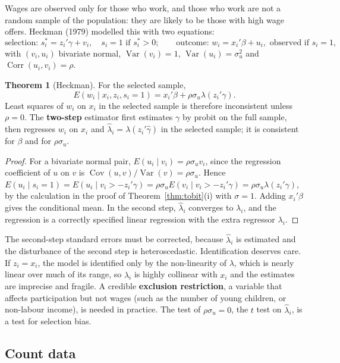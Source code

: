 \documentclass[11pt,a4paper]{article}
\numberwithin{equation}{section}
\DeclareMathOperator{\Var}{Var}
\DeclareMathOperator{\Cov}{Cov}
\DeclareMathOperator{\Corr}{Corr}
\theoremstyle{definition}
\newtheorem{thm}{Theorem}[subsection]
\begin{document}
Wages are observed only for those who work, and those who work are not a random sample of the population: they are likely to be those with
high wage offers. Heckman (1979) modelled this with two equations:
\[
\text{selection: } s_i^* = z_i'\gamma + v_i, \quad s_i = 1 \text{ if } s_i^* > 0; \qquad \text{outcome: } w_i = x_i'\beta + u_i, \text{ observed if } s_i = 1,
\]
with $(v_i, u_i)$ bivariate normal, $\Var(v_i) = 1$, $\Var(u_i) = \sigma_u^2$ and $\Corr(u_i, v_i) = \rho$.

\begin{thm}[Heckman]
\label{thm:heckman}
For the selected sample,
\[
E(w_i \mid x_i, z_i, s_i = 1) = x_i'\beta + \rho\sigma_u\lambda(z_i'\gamma) .
\]
Least squares of $w_i$ on $x_i$ in the selected sample is therefore inconsistent unless $\rho = 0$. The \textbf{two-step} estimator first estimates $\gamma$ by probit on the full
sample, then regresses $w_i$ on $x_i$ and $\hat\lambda_i = \lambda(z_i'\hat\gamma)$ in the selected sample; it is consistent for $\beta$ and for $\rho\sigma_u$.
\end{thm}

\begin{proof}
For a bivariate normal pair, $E(u_i \mid v_i) = \rho\sigma_uv_i$, since the regression coefficient of $u$ on $v$ is $\Cov(u, v)/\Var(v) = \rho\sigma_u$. Hence
$E(u_i \mid s_i = 1) = E(u_i \mid v_i > -z_i'\gamma) = \rho\sigma_uE(v_i \mid v_i > -z_i'\gamma) = \rho\sigma_u\lambda(z_i'\gamma)$, by the calculation in the proof of Theorem~\ref{thm:tobit}(i) with $\sigma = 1$. Adding
$x_i'\beta$ gives the conditional mean. In the second step, $\hat\lambda_i$ converges to $\lambda_i$, and the regression is a correctly specified linear regression with the extra
regressor $\lambda_i$.
\end{proof}

The second-step standard errors must be corrected, because $\hat\lambda_i$ is estimated and the disturbance of the second step is heteroscedastic.
Identification deserves care. If $z_i = x_i$, the model is identified only by the non-linearity of $\lambda$, which is nearly linear over much of its range, so $\hat\lambda_i$
is highly collinear with $x_i$ and the estimates are imprecise and fragile. A credible \textbf{exclusion restriction}, a variable that affects participation but
not wages (such as the number of young children, or non-labour income), is needed in practice. The test of $\rho\sigma_u = 0$, the $t$ test on $\hat\lambda_i$, is a test for selection
bias.

\subsection{Count data}
\label{ssec:counts}
\end{document}
